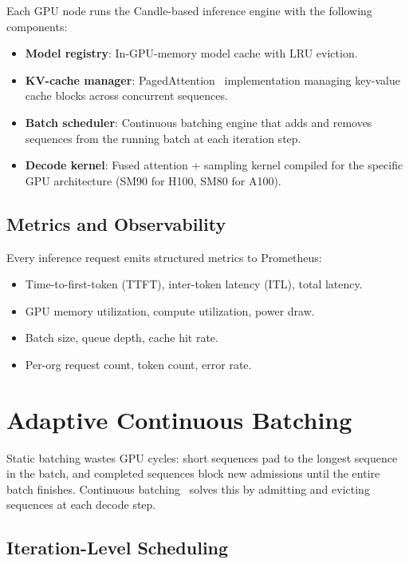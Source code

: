 \documentclass[11pt]{article}
\begin{document}
Each GPU node runs the Candle-based inference engine with the following
components:
\begin{itemize}[leftmargin=1.1em]
    \item \textbf{Model registry}: In-GPU-memory model cache with LRU eviction.
    \item \textbf{KV-cache manager}: PagedAttention~\cite{vllm2023} implementation
    managing key-value cache blocks across concurrent sequences.
    \item \textbf{Batch scheduler}: Continuous batching engine that adds and
    removes sequences from the running batch at each iteration step.
    \item \textbf{Decode kernel}: Fused attention + sampling kernel compiled
    for the specific GPU architecture (SM90 for H100, SM80 for A100).
\end{itemize}

\subsection{Metrics and Observability}

Every inference request emits structured metrics to Prometheus:
\begin{itemize}[leftmargin=1.1em]
    \item Time-to-first-token (TTFT), inter-token latency (ITL), total latency.
    \item GPU memory utilization, compute utilization, power draw.
    \item Batch size, queue depth, cache hit rate.
    \item Per-org request count, token count, error rate.
\end{itemize}

\section{Adaptive Continuous Batching}
\label{sec:batching}

Static batching wastes GPU cycles: short sequences pad to the longest sequence
in the batch, and completed sequences block new admissions until the entire
batch finishes. Continuous batching~\cite{orca2022} solves this by admitting and
evicting sequences at each decode step.

\subsection{Iteration-Level Scheduling}
\end{document}

